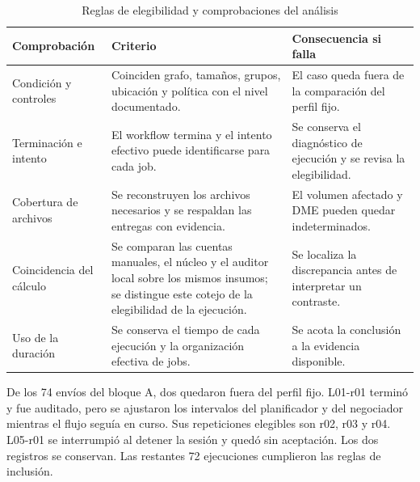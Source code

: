 \begin{table}[htbp]\centering\small
\caption{Reglas de elegibilidad y comprobaciones del análisis}
\begin{tabularx}{\linewidth}{@{}P{3.3cm}YY@{}}
\toprule Comprobación & Criterio & Consecuencia si falla\\\midrule
Condición y controles & Coinciden grafo, tamaños, grupos, ubicación y política con el nivel documentado. & El caso queda fuera de la comparación del perfil fijo.\\
Terminación e intento & El workflow termina y el intento efectivo puede identificarse para cada job. & Se conserva el diagnóstico de ejecución y se revisa la elegibilidad.\\
Cobertura de archivos & Se reconstruyen los archivos necesarios y se respaldan las entregas con evidencia. & El volumen afectado y DME pueden quedar indeterminados.\\
Coincidencia del cálculo & Se comparan las cuentas manuales, el núcleo y el auditor local sobre los mismos insumos; se distingue este cotejo de la elegibilidad de la ejecución. & Se localiza la discrepancia antes de interpretar un contraste.\\
Uso de la duración & Se conserva el tiempo de cada ejecución y la organización efectiva de jobs. & Se acota la conclusión a la evidencia disponible.\\
\bottomrule
\end{tabularx}
\end{table}

De los 74 envíos del bloque A, dos quedaron fuera del perfil fijo. L01-r01 terminó y fue auditado, pero se ajustaron los intervalos del planificador y del negociador mientras el flujo seguía en curso. Sus repeticiones elegibles son r02, r03 y r04. L05-r01 se interrumpió al detener la sesión y quedó sin aceptación. Los dos registros se conservan. Las restantes 72 ejecuciones cumplieron las reglas de inclusión.
